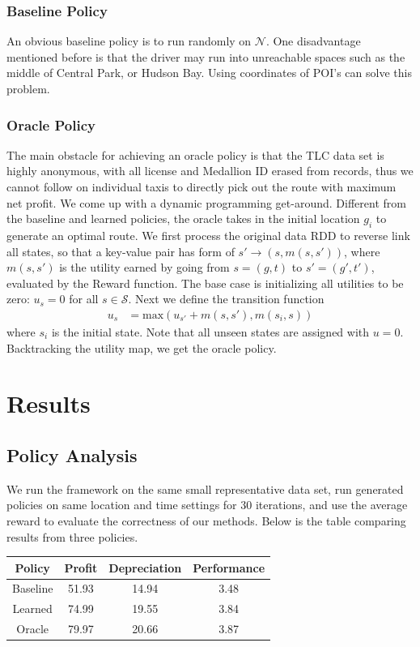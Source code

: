 \documentclass[letterpaper, 10 pt, conference]{ieeeconf}
\begin{document}
\subsubsection{Baseline Policy}
An obvious baseline policy is to run randomly on $\mathcal{N}$. One disadvantage mentioned before is that the driver may run into unreachable spaces such as the middle of Central Park, or Hudson Bay. Using coordinates of POI's can solve this problem.
\subsubsection{Oracle Policy}
The main obstacle for achieving an oracle policy is that the TLC data set is highly anonymous, with all license and Medallion ID erased from records, thus we cannot follow on individual taxis to directly pick out the route with maximum net profit. We come up with a dynamic programming get-around. Different from the baseline and learned policies, the oracle takes in the initial location $g_i$ to generate an optimal route. We first process the original data RDD to reverse link all states, so that a key-value pair has form of $s'\to(s,m(s,s'))$, where $m(s,s')$ is the utility earned by going from $s=(g,t)$ to $s'=(g',t')$, evaluated by the Reward function. The base case is initializing all utilities to be zero: $u_s=0$ for all $s\in\mathcal{S}$. Next we define the transition function
\begin{align}
u_s &= \text{max}(u_{s'}+m(s, s'), m(s_i, s))
\end{align}
where $s_i$ is the initial state. Note that all unseen states are assigned with $u=0$. Backtracking the utility map, we get the oracle policy.
\section{Results}
\subsection{Policy Analysis}
We run the framework on the same small representative data set, run generated policies on same location and time settings for 30 iterations, and use the average reward to evaluate the correctness of our methods. Below is the table comparing results from three policies.
\begin{center}
\begin{tabular}{|c||c|c|c|}
\hline
Policy & Profit & Depreciation & Performance \\ \hline
Baseline & 51.93 & 14.94 & 3.48 \\    \hline
Learned & 74.99 & 19.55 & 3.84 \\    \hline
Oracle & 79.97 & 20.66 & 3.87 \\    \hline
\end{tabular}
\end{center}
\end{document}
